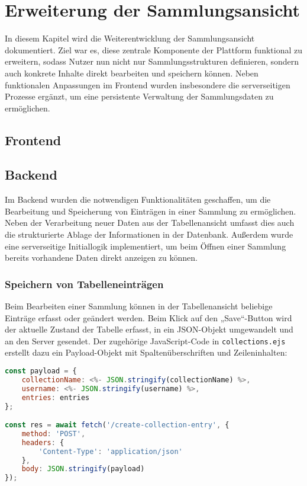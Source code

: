 \section{Erweiterung der Sammlungsansicht}\label{sec:erweiterung-der-sammlungsansicht}

In diesem Kapitel wird die Weiterentwicklung der Sammlungsansicht dokumentiert.
Ziel war es, diese zentrale Komponente der Plattform funktional zu erweitern, sodass Nutzer nun nicht nur Sammlungsstrukturen definieren, sondern auch konkrete Inhalte direkt bearbeiten und speichern können.
Neben funktionalen Anpassungen im Frontend wurden insbesondere die serverseitigen Prozesse ergänzt, um eine persistente Verwaltung der Sammlungsdaten zu ermöglichen.

\subsection{Frontend}

\subsection{Backend}

Im Backend wurden die notwendigen Funktionalitäten geschaffen, um die Bearbeitung und Speicherung von Einträgen in einer Sammlung zu ermöglichen.
Neben der Verarbeitung neuer Daten aus der Tabellenansicht umfasst dies auch die strukturierte Ablage der Informationen in der Datenbank.
Außerdem wurde eine serverseitige Initiallogik implementiert, um beim Öffnen einer Sammlung bereits vorhandene Daten direkt anzeigen zu können.

\subsubsection{Speichern von Tabelleneinträgen}

Beim Bearbeiten einer Sammlung können in der Tabellenansicht beliebige Einträge erfasst oder geändert werden.
Beim Klick auf den „Save“-Button wird der aktuelle Zustand der Tabelle erfasst, in ein JSON-Objekt umgewandelt und an den Server gesendet.
Der zugehörige JavaScript-Code in \texttt{collections.ejs} erstellt dazu ein Payload-Objekt mit Spaltenüberschriften und Zeileninhalten:

\begin{lstlisting}[language=JavaScript, caption=Payload-Erstellung im Frontend]
const payload = {
    collectionName: <%- JSON.stringify(collectionName) %>,
    username: <%- JSON.stringify(username) %>,
    entries: entries
};

const res = await fetch('/create-collection-entry', {
    method: 'POST',
    headers: {
        'Content-Type': 'application/json'
    },
    body: JSON.stringify(payload)
});
\end{lstlisting}

